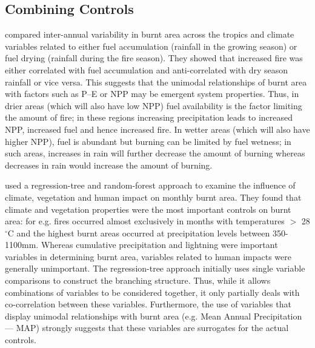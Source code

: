 \subsection{Combining Controls}
 \citet{van2008climate} compared inter-annual variability in burnt area across the tropics and climate variables related to either fuel accumulation (rainfall in the growing season) or fuel drying (rainfall during the fire season). They showed that increased fire was either correlated with fuel accumulation and anti-correlated with dry season rainfall or vice versa.
This suggests that the unimodal relationships of burnt area with factors such as P--E or NPP may be emergent system properties. Thus, in drier areas (which will also have low NPP) fuel availability is the factor limiting the amount of fire; in these regions increasing precipitation leads to increased NPP, increased fuel and hence increased fire. In wetter areas (which will also have higher NPP), fuel is abundant but burning can be limited by fuel wetness; in such areas, increases in rain will further decrease the amount of burning whereas decreases in rain would increase the amount of burning.



\citet{aldersley2011global}
used a regression-tree and random-forest approach to examine the influence of climate, vegetation and human impact on monthly burnt area.
They found that climate and vegetation properties were the most important controls on burnt area: for e.g. fires occurred almost exclusively in months with temperatures $>$ 28$^{\circ}$C and the highest burnt areas occurred at precipitation levels between 350-1100mm.
Whereas cumulative precipitation and lightning were important variables in determining burnt area, variables related to human impacts were generally unimportant.
The regression-tree approach initially uses single variable comparisons to construct the branching structure. Thus, while it allows combinations of variables to be considered together, it only partially deals with co-correlation between these variables.
Furthermore, the use of variables that display unimodal relationships with burnt area (e.g. Mean Annual Precipitation --- MAP) strongly suggests that these variables are surrogates for the actual controls.

